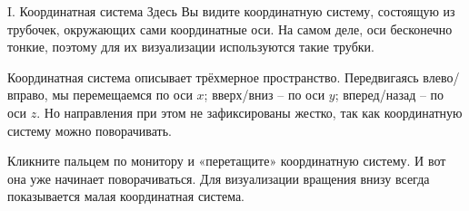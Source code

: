 \begin{surferPage}{I. Координатная система}
Здесь Вы видите координатную систему, состоящую из трубочек, окружающих сами координатные оси. На самом деле, оси бесконечно тонкие, поэтому для их визуализации используются такие трубки.

Координатная система описывает трёхмерное пространство. Передвигаясь влево/вправо, мы перемещаемся по оси $x$; вверх/вниз – по оси $y$; вперед/назад – по оси $z$. Но направления при этом не зафиксированы жестко, так как координатную систему можно поворачивать.

Кликните пальцем по монитору и «перетащите» координатную систему. И вот она уже начинает поворачиваться. Для визуализации вращения внизу всегда показывается малая координатная система.
\end{surferPage}
